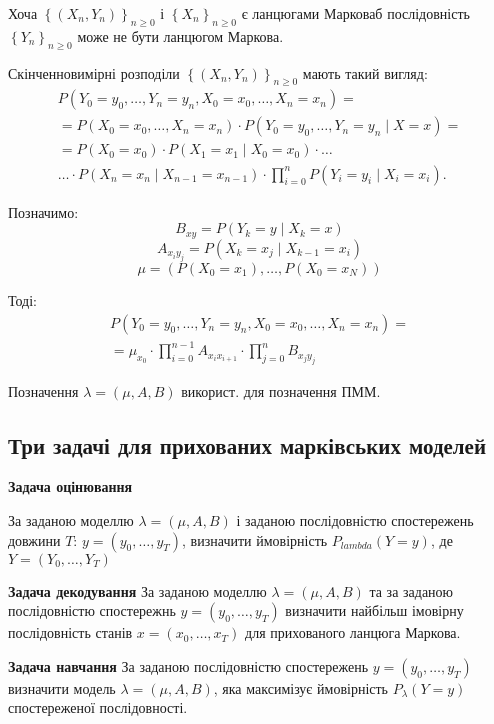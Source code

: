 \begin{remark}
  Хоча $\left\{ \left( X_n, Y_n \right) \right\}_{n \geq 0}$ і $\left\{ X_n \right\}_{n \geq 0}$ 
  є ланцюгами Марковаб послідовність $\left\{ Y_{n} \right\} _{n\geq 0}$ може не бути
  ланцюгом Маркова.
\end{remark}

Скінченновимірні розподіли $\left\{ \left( X_n, Y_n \right)  \right\} _{n \geq 0}$ мають такий
вигляд:
\begin{gather*}
P\left( Y_{0} = y_0, \ldots, Y_n = y_n, X_0 = x_0, \ldots, X_n = x_n \right) = \\
= P\left( X_0 = x_0, \ldots, X_n = x_n \right) \cdot P\left( Y_0 = y_0, \ldots, Y_n = y_n
 \mid X = x \right) = \\
= P\left( X_0 = x_0 \right) \cdot P\left( X_1 = x_1  \mid X_0 = x_0 \right) \cdot \ldots \\
\ldots \cdot P\left( X_n = x_n  \mid X_{n-1} = x_{n-1} \right) \cdot
\prod_{i=0}^{n} P\left( Y_{i}= y_i \mid X_i = x_i \right).
\end{gather*}

Позначимо:
\[ B_{xy} = P\left( Y_{k} = y \mid X_k = x \right) \] 
\[ A_{x_i y_j} = P\left( X_{k} = x_j \mid X_{k-1} = x_i \right) \] 
\[ \mu = \left( P\left( X_0 = x_1 \right), \ldots, P\left( X_0 = x_N \right) \right)  \]

Тоді:
\begin{gather*}
 P\left( Y_0 = y_0, \ldots, Y_n = y_n, X_0 = x_0, \ldots, X_n = x_n \right) = \\
 = \mu_{x_0} \cdot \prod_{i=0}^{n-1} A_{x_i x_{i+1}} \cdot \prod_{j=0}^{n} B_{x_j y_j}  
\end{gather*}

Позначення $\lambda = \left( \mu, A, B \right) $ використ. для позначення ПММ.


\subsection{Три задачі для прихованих марківських моделей}

\textbf{Задача оцінювання}

За заданою моделлю $\lambda = \left( \mu, A, B \right) $ і заданою послідовністю спостережень
довжини $T$:  $y = \left( y_0, \ldots, y_T \right) $, визначити ймовірність
$P_{lambda} \left( Y = y \right) $, де $Y = \left( Y_0, \ldots, Y_T \right) $


\textbf{Задача декодування}
За заданою моделлю $\lambda = \left( \mu, A, B \right) $ та за заданою послідовністю спостережнь 
$y = \left( y_0, \ldots, y_T \right) $ визначити найбільш імовірну послідовність станів
$x = \left( x_0, \ldots, x_T \right) $ для прихованого ланцюга Маркова.

\textbf{Задача навчання}
За заданою послідовністю спостережень $y = \left( y_0, \ldots, y_T \right) $ визначити модель
$\lambda = \left( \mu, A, B \right) $, яка максимізує ймовірність $P_{\lambda}\left( Y = y \right)$
спостереженої послідовності.

